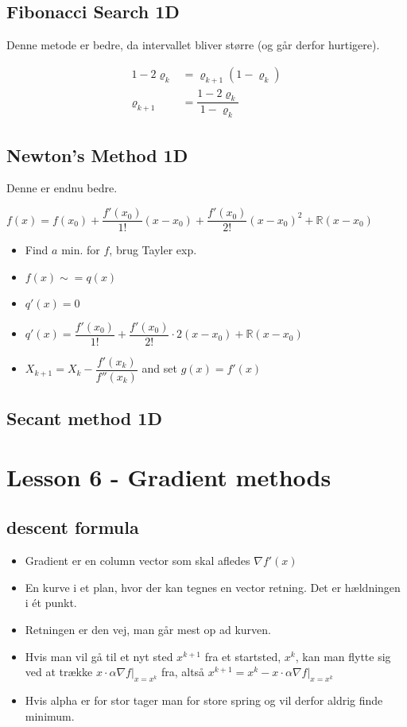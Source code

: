 \documentclass[danish, 10pt]{Memoir}
\begin{document}
\subsection{Fibonacci Search 1D}
Denne metode er bedre, da intervallet bliver større (og går derfor hurtigere).

\begin{align*}
1-2 \varrho_k &= \varrho_{k+1}(1-\varrho_k) \\
\varrho_{k+1} &= \dfrac{1-2 \varrho_k}{1-\varrho_k}
\end{align*}





\subsection{Newton's Method 1D}
Denne er endnu bedre.

$f(x) = f(x_0) + \dfrac{f'(x_0)}{1!}(x-x_0) + \dfrac{f'(x_0)}{2!}(x-x_0)^2 + \mathbb{R}(x-x_0) $

\begin{itemize}
	\item Find $a$ min. for $f$, brug Tayler exp.
	\item $f(x) \sim{=} q(x)$
	\item $q'(x)=0 $
	\item $q'(x) = \dfrac{f'(x_0)}{1!} + \dfrac{f'(x_0)}{2!}\cdot 2(x-x_0) + \mathbb{R}(x-x_0)$
	\item $X_{k+1} = X_k-\dfrac{f'(x_k)}{f''(x_k)}$ and set $g(x) = f'(x)$
\end{itemize}


\subsection{Secant method 1D}





\newpage
\section*{Lesson 6 - Gradient methods}

\subsection{descent formula}
\begin{itemize}
	\item Gradient er en column vector som skal afledes $\nabla f'(x)$
	\item En kurve i et plan, hvor der kan tegnes en vector retning. Det er hældningen i ét punkt.
	\item Retningen er den vej, man går mest op ad kurven.
	\item Hvis man vil gå til et nyt sted $x^{k+1}$ fra et startsted, $x^k$, kan man flytte sig ved at trække $x \cdot \alpha \nabla f |_{x=x^k}$ fra, altså $x^{k+1} = x^k - x \cdot \alpha \nabla f |_{x=x^k}$
	\item Hvis alpha er for stor tager man for store spring og vil derfor aldrig finde minimum.
\end{itemize}
\end{document}

